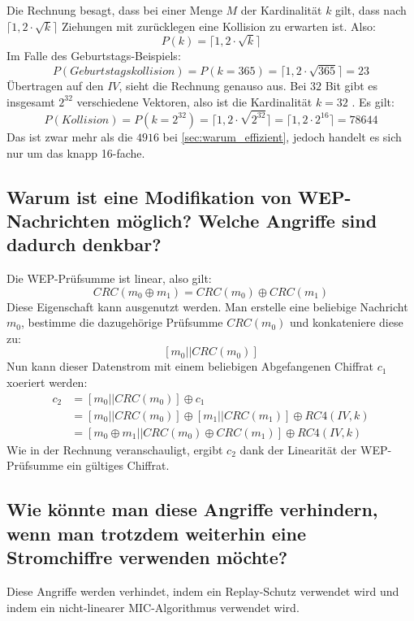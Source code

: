 Die Rechnung besagt, dass bei einer Menge $M$ der Kardinalität $k$ gilt, dass nach $\lceil 1,2 \cdot \sqrt{k} \rceil$ Ziehungen mit zurücklegen eine Kollision zu erwarten ist. Also:
$$
P(k) = \lceil 1,2 \cdot \sqrt{k} \rceil
$$
Im Falle des Geburtstags-Beispiels:
$$
P(Geburtstagskollision) = P(k=365) = \lceil 1,2 \cdot \sqrt{365} \rceil = 23
$$
Übertragen auf den $IV$, sieht die Rechnung genauso aus. Bei $32$ Bit gibt es insgesamt $2^{32}$ verschiedene Vektoren, also ist die Kardinalität $k=32$ . Es gilt:
$$
P(Kollision) = P(k=2^{32}) = \lceil 1,2 \cdot \sqrt{2^{32}} \rceil = \lceil 1,2 \cdot 2^{16} \rceil = 78644
$$
Das ist zwar mehr als die $4916$ bei \ref{sec:warum_effizient}, jedoch handelt es sich nur um das knapp 16-fache.

\subsection{Warum ist eine Modifikation von WEP-Nachrichten möglich? Welche Angriffe sind dadurch denkbar?}
Die WEP-Prüfsumme ist linear, also gilt:
$$
CRC(m_0 \oplus m_1) = CRC(m_0) \oplus CRC(m_1)
$$
Diese Eigenschaft kann ausgenutzt werden. Man erstelle eine beliebige Nachricht $m_0$, bestimme die dazugehörige Prüfsumme $CRC(m_0)$ und konkateniere diese zu:
$$
[m_0 || CRC(m_0)]
$$
Nun kann dieser Datenstrom mit einem beliebigen Abgefangenen Chiffrat $c_1$ xoeriert werden:
$$
\begin{aligned}
c_2 &= [m_0 || CRC(m_0)] \oplus c_1 \\
        &= [m_0 || CRC(m_0)] \oplus [m_1||CRC(m_1)] \oplus RC4(IV,k) \\
        &= [m_0 \oplus m_1 || CRC(m_0) \oplus CRC(m_1)] \oplus RC4(IV,k)
\end{aligned}
$$
Wie in der Rechnung veranschauligt, ergibt $c_2$ dank der Linearität der WEP-Prüfsumme ein gültiges Chiffrat.

\subsection{Wie könnte man diese Angriffe verhindern, wenn man trotzdem weiterhin eine Stromchiffre verwenden möchte?}
Diese Angriffe werden verhindet, indem ein Replay-Schutz verwendet wird und indem ein nicht-linearer MIC-Algorithmus verwendet wird.